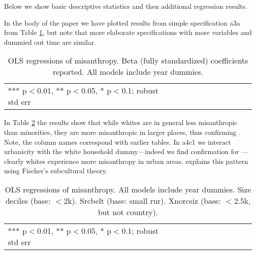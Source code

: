 \documentclass[11pt, letterpaper]{article}
\begin{document}
\begin{spacing}{1.4}
Below we show basic descriptive statistics and then  additional regression results.


 
 
 
 

In the body of the paper we have plotted  results from simple specification a3a
from Table \ref{regDbyHand}, but note that more elaborate specifications with
more variables and dummied out time are similar.

 \begin{spacing}{.8}
\begin{table}[H]\centering
\caption{OLS regressions  of misanthropy. Beta (fully standardized) coefficients
  reported. All models include year dummies.} \label{regDbyHand}
\begin{scriptsize} \begin{tabular}{p{1.2in}p{.45in}p{.45in}p{.45in}p{.45in}p{.45in}p{.45in}p{.45in}p{.45in}p{.45in}p{.45 in}}\hline
 \hline  *** p$<$0.01, ** p$<$0.05, * p$<$0.1; robust std err
\end{tabular}\end{scriptsize}\end{table}
 \end{spacing}


In Table \ref{regE} the results show that while whites are in general less misanthropic
than minorities, they are more misanthropic in larger places, thus confirming
\citet{wilson85}. Note, the column names correspond with earlier tables.  
 In a4c1 we interact urbanicity with the white household dummy---indeed we find confirmation for \citet{wilson85}---clearly whites
 experience more misanthropy in urban areas. \citet{wilson85} explains this
 pattern 
 using Fischer's subcultural theory.

 \begin{spacing}{.8}
   \begin{table}[H]\centering
     \caption{OLS regressions  of misanthropy. All models include year
       dummies. Size deciles (base: $<$2k). Srcbelt (base: small rur). Xnorcsiz (base: $<$2.5k, but not country).} \label{regE}
     \begin{scriptsize} \begin{tabular}{p{1.2in}p{.45in}p{.45in}p{.45in}p{.45in}p{.45in}p{.45in}p{.45in}p{.45in}p{.45in}p{.45 in}}\hline
         
         \hline  *** p$<$0.01, ** p$<$0.05, * p$<$0.1; robust std err
       \end{tabular}\end{scriptsize}\end{table}
 \end{spacing}



 
\end{spacing}
\end{document}
